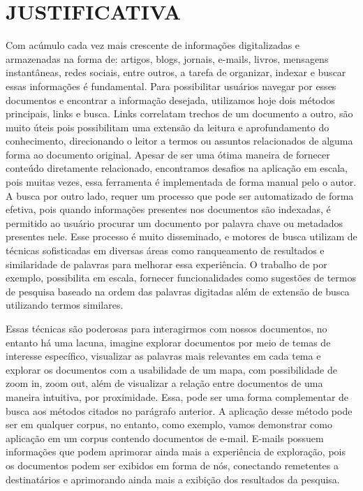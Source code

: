 \documentclass[12pt,a4paper]{article}
\begin{document}
\section{JUSTIFICATIVA}
Com acúmulo cada vez mais crescente de informações digitalizadas e armazenadas na forma de: artigos, blogs, jornais, e-mails, livros, mensagens instantâneas, redes sociais, entre outros, 
 a tarefa de organizar, indexar e buscar essas informações é fundamental. Para possibilitar usuários navegar por esses documentos e encontrar a informação desejada, utilizamos hoje dois métodos principais, 
 links e busca. Links correlatam trechos de um documento a outro, são muito úteis pois possibilitam uma extensão da leitura e aprofundamento do conhecimento,
 direcionando o leitor a termos ou assuntos relacionados de alguma forma ao documento original. Apesar de ser uma ótima maneira de fornecer conteúdo diretamente relacionado,
 encontramos desafios na aplicação em escala, pois muitas vezes, essa ferramenta  é implementada de forma manual pelo o autor. A busca por outro lado,
 requer um processo que pode ser automatizado de forma efetiva, pois quando informações presentes nos documentos são indexadas, é permitido ao usuário procurar um documento por palavra chave ou metadados presentes nele.
 Esse processo é muito disseminado, e motores de busca utilizam de técnicas sofisticadas em diversas áreas como ranqueamento de resultados e similaridade de palavras para melhorar essa experiência.
 O trabalho de  por exemplo, possibilita em escala, fornecer funcionalidades como sugestões de termos de pesquisa baseado na ordem das palavras digitadas além de extensão de busca utilizando termos similares.

Essas técnicas são poderosas para interagirmos com nossos documentos, no entanto há uma lacuna, imagine explorar documentos por meio de temas de interesse específico,
 visualizar as palavras mais relevantes em cada tema e explorar os documentos com a usabilidade de um mapa, com possibilidade de zoom in, zoom out, além de visualizar a relação entre documentos de uma maneira intuitiva,
 por proximidade. Essa, pode ser uma forma complementar de busca aos métodos citados no parágrafo anterior. A aplicação desse método pode ser em qualquer corpus, no entanto, como exemplo,
 vamos demonstrar como aplicação em um corpus contendo documentos de e-mail. E-mails possuem informações que podem aprimorar ainda mais a experiência de exploração,
 pois os documentos podem ser exibidos em forma de nós, conectando remetentes a destinatários e aprimorando ainda mais a exibição dos resultados da pesquisa.
\end{document}

